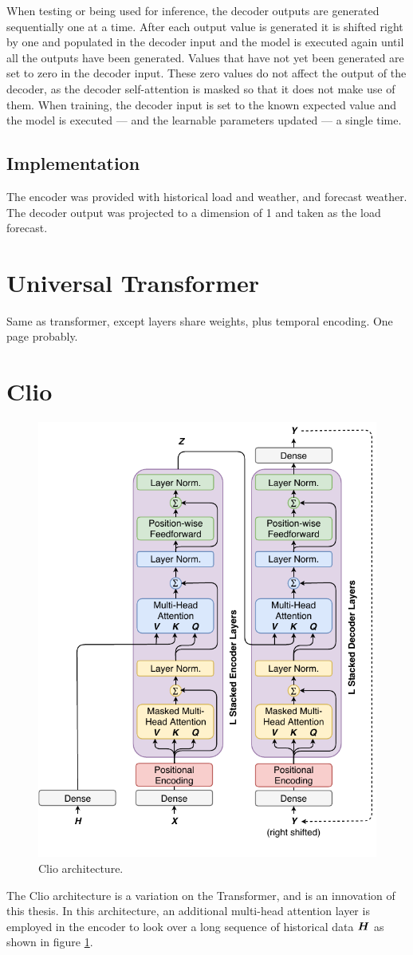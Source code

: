 When testing or being used for inference, the decoder outputs are generated sequentially one at a time.
After each output value is generated it is shifted right by one and populated in the decoder input and the model is executed again until all the outputs have been generated.
Values that have not yet been generated are set to zero in the decoder input.
These zero values do not affect the output of the decoder, as the decoder self-attention is masked so that it does not make use of them.
When training, the decoder input is set to the known expected value and the model is executed --- and the learnable parameters updated --- a single time.

\subsection{Implementation}
The encoder was provided with historical load and weather, and forecast weather.
The decoder output was projected to a dimension of 1 and taken as the load forecast.

\section{Universal Transformer}
Same as transformer, except layers share weights, plus temporal encoding. One page probably.

\section{Clio}

\begin{figure}[htbp]
	\centerline{\includegraphics[width=.35\textwidth]{images/clio.pdf}}
	\caption{Clio architecture.}
	\label{fig:clio}
\end{figure}

The Clio architecture is a variation on the Transformer, and is an innovation of this thesis.
In this architecture, an additional multi-head attention layer is employed in the encoder to look over a long sequence of historical data ${\bm{H}}$ as shown in figure \ref{fig:clio}.

